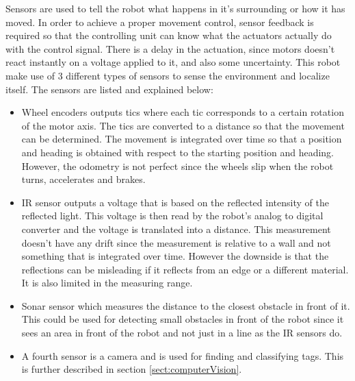 Sensors are used to tell the robot what happens in it’s surrounding or how it has moved. 
In order to achieve a proper movement control, sensor feedback is required so that the controlling unit can know what the actuators actually do with the control signal. There is a delay in the actuation, since motors doesn’t react instantly on a voltage applied to it, and also some uncertainty. This robot make use of 3 different types of sensors to sense the environment and localize itself. The sensors are listed and explained below:
\begin{itemize}
\item Wheel encoders outputs tics where each tic corresponds to a certain rotation of the motor axis. The tics are converted to a distance so that the movement can be determined. The movement is integrated over time so that a position and heading is obtained with respect to the starting position and heading. However, the odometry is not perfect since the wheels slip when the robot turns, accelerates and brakes. 

\item IR sensor outputs a voltage that is based on the reflected intensity of the reflected light. This voltage is then read by the robot’s analog to digital converter and the voltage is translated into a distance. This measurement doesn’t have any drift since the measurement is relative to a wall and not something that is integrated over time. However the downside is that the reflections can be misleading if it reflects from an edge or a different material. It is also limited in the measuring range.

\item Sonar sensor which measures the distance to the closest obstacle in front of it. This could be used for detecting small obstacles in front of the robot since it sees an area in front of the robot and not just in a line as the IR sensors do.

\item A fourth sensor is a camera and is used for finding and classifying tags. This is further described in section \ref{sect:computerVision}.

\end{itemize}